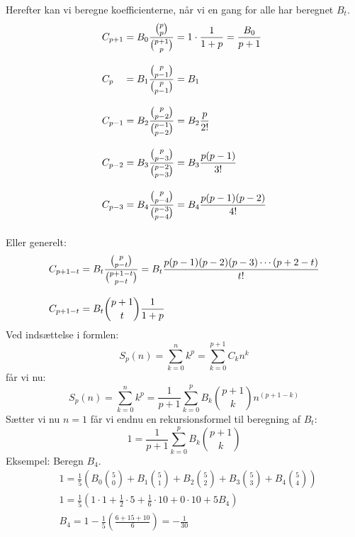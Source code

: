 Herefter kan vi beregne koefficienterne, når vi en gang for alle har beregnet \(B_{t}\). 
\begin{align*}
&C_{p+1}=B_{0}\frac{\binom{p}{p}}{\binom{p+1}{p}}=1 \cdot \frac{1}{1+p}=\frac{B_{0}}{p+1}\nylinie
&C_{p\phantom{+1}}=B_{1}\frac{\binom{p}{p-1}}{\binom{p}{p-1}}=B_{1}\nylinie
&C_{p-1}=B_{2}\frac{\binom{p}{p-2}}{\binom{p-1}{p-2}}=B_{2}\frac{p}{2!}\nylinie
&C_{p-2}=B_{3}\frac{\binom{p}{p-3}}{\binom{p-2}{p-3}}=B_{3}\frac{p(p-1)}{3!}\nylinie
&C_{p-3}=B_{4}\frac{\binom{p}{p-4}}{\binom{p-3}{p-4}}=B_{4}\frac{p(p-1)(p-2)}{4!}\nylinie
\end{align*}
Eller generelt:
\begin{align*}
&C_{p+1-t}=B_{t}\frac{\binom{p}{p-t}}{\binom{p+1-t}{p-t}}=B_{t}\frac{p(p-1)(p-2)(p-3) \dotsm (p+2-t)}{t!}\nylinie
&C_{p+1-t}=B_{t}\binom{p+1}{t}\frac{1}{1+p}
\end{align*}
Ved indsættelse i formlen:
\[S_p(n)=\sum_{k=0}^{n}k^p=\sum_{k=0}^{p+1}C_{k}n^k\]
får vi nu:
\[S_p(n)=\sum_{k=0}^{n}k^p=\frac{1}{p+1}\sum_{k=0}^{p}B_{k}\binom{p+1}{k}n^{(p+1-k)}\]
Sætter vi nu \(n=1\) får vi endnu en rekursionsformel til beregning af \(B_{t}\):
\[1=\frac{1}{p+1}\sum_{k=0}^{p}B_{k}\binom{p+1}{k}\]
Eksempel: Beregn \(B_{4}\).
\begin{align*}
&1=\frac{1}{5}(B_{0}\binom{5}{0}+B_{1}\binom{5}{1}+B_{2}\binom{5}{2}+B_{3}\binom{5}{3}+B_{4}\binom{5}{4})\\
&1=\frac{1}{5}(1 \cdot 1 + \frac{1}{2} \cdot 5 + \frac{1}{6} \cdot 10 + 0 \cdot  10 + 5B_{4})\\
&B_{4}=1-\frac{1}{5}(\frac{6+15+10}{6})=-\frac{1}{30}\\
\end{align*}







